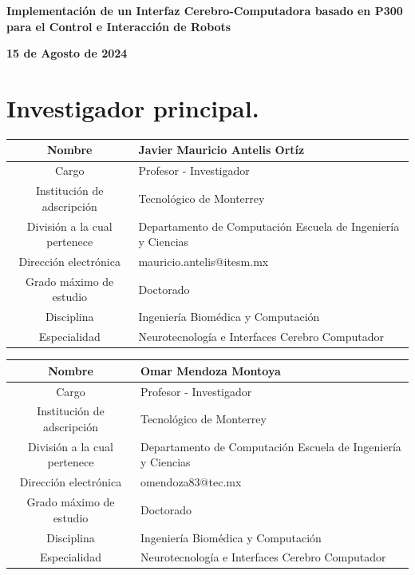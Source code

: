 \documentclass[12pt]{article}
\begin{document}
\begin{flushleft}
    \textbf{\Large Implementación de un Interfaz Cerebro-Computadora basado en P300 para el Control e Interacción de Robots}
    \par
    \textbf{15 de Agosto de 2024}
\end{flushleft}

\section{Investigador principal.}

\begin{table}[h!]
    \centering
    \begin{tabular}{|c|p{7cm}|} \hline
        Nombre & Javier Mauricio Antelis Ortíz \\ \hline
        Cargo & Profesor - Investigador \\ \hline
        Institución de adscripción & Tecnológico de Monterrey \\ \hline
        División a la cual pertenece & Departamento de Computación \newline Escuela de Ingeniería y Ciencias \\ \hline
        Dirección electrónica & mauricio.antelis@itesm.mx \\ \hline
        Grado máximo de estudio & Doctorado \\ \hline
        Disciplina & Ingeniería Biomédica y Computación \\ \hline
        Especialidad & Neurotecnología e Interfaces Cerebro Computador \\ \hline
    \end{tabular}
\end{table}

\begin{table}[h!]
    \centering
    \begin{tabular}{|c|p{7cm}|} \hline
        Nombre & Omar Mendoza Montoya \\ \hline
        Cargo & Profesor - Investigador \\ \hline
        Institución de adscripción & Tecnológico de Monterrey \\ \hline
        División a la cual pertenece & Departamento de Computación \newline Escuela de Ingeniería y Ciencias \\ \hline
        Dirección electrónica & omendoza83@tec.mx \\ \hline
        Grado máximo de estudio & Doctorado \\ \hline
        Disciplina & Ingeniería Biomédica y Computación \\ \hline
        Especialidad & Neurotecnología e Interfaces Cerebro Computador \\ \hline
    \end{tabular}
\end{table}
\end{document}
